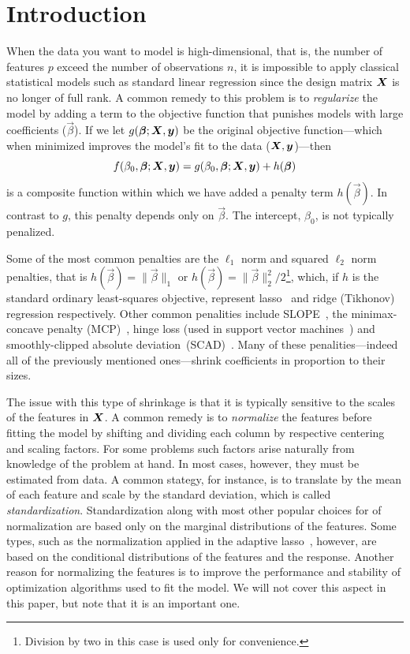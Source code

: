 \section{Introduction}

When the data you want to model is high-dimensional, that is, the number of features \(p\)
exceed the number of observations \(n\), it is impossible to apply classical statistical
models such as standard linear regression since the design matrix \(\boldsymbol X\) is no longer
of full rank. A common remedy to this problem is to \emph{regularize} the model by adding a
term to the objective function that punishes models with large coefficients
(\(\vec\beta\)). If we let \(g(\boldsymbol\beta; \boldsymbol X, \boldsymbol y)\) be the original objective
function---which when minimized improves the model's fit to the data (\(\boldsymbol X, \boldsymbol
y\))---then
\[
  f(\beta_0, \boldsymbol\beta; \boldsymbol X, \boldsymbol y) = g(\beta_0, \boldsymbol\beta; \boldsymbol X, \boldsymbol y) + h(\boldsymbol\beta)
\]
is a composite function within which we have added a penalty term \(h(\vec\beta)\). In
contrast to \(g\), this penalty depends only on \(\vec{\beta}\). The intercept,
\(\beta_0\), is not typically penalized.

Some of the most common penalties are the \(\ell_1\) norm and squared \(\ell_2\) norm
penalties, that is \(h(\vec\beta) = \lVert \vec\beta \rVert_1\) or \(h(\vec\beta) = \lVert
\vec\beta \rVert_2^2/2\)\footnote{Division by two in this case is used only for
  convenience.}, which, if \(h\) is the standard ordinary least-squares objective, represent
lasso~\citep{tibshirani1996,santosa1986,donoho1994} and ridge (Tikhonov) regression
respectively. Other common penalities include SLOPE~\citep{bogdan2013,bogdan2015}, the
minimax-concave penalty (MCP)~\citep{zhang2010}, hinge loss (used in support vector
machines~\citep{cortes1995}) and smoothly-clipped absolute
deviation~(SCAD)~\citep{fan2001}. Many of these penalities---indeed all of the previously
mentioned ones---shrink coefficients in proportion to their sizes.

The issue with this type of shrinkage is that it is typically sensitive to the scales of
the features in \(\boldsymbol X\). A common remedy is to \emph{normalize} the features before
fitting the model by shifting and dividing each column by respective centering and scaling
factors. For some problems such factors arise naturally from knowledge of the problem at
hand. In most cases, however, they must be estimated from data. A common stategy, for
instance, is to translate by the mean of each feature and scale by the standard deviation,
which is called \emph{standardization}. Standardization along with most other popular
choices for of normalization are based only on the marginal distributions of the features.
Some types, such as the normalization applied in the adaptive lasso~\citep{zou2006},
however, are based on the conditional distributions of the features and the response.
Another reason for normalizing the features is to improve the performance and stability of
optimization algorithms used to fit the model. We will not cover this aspect in this paper,
but note that it is an important one.

